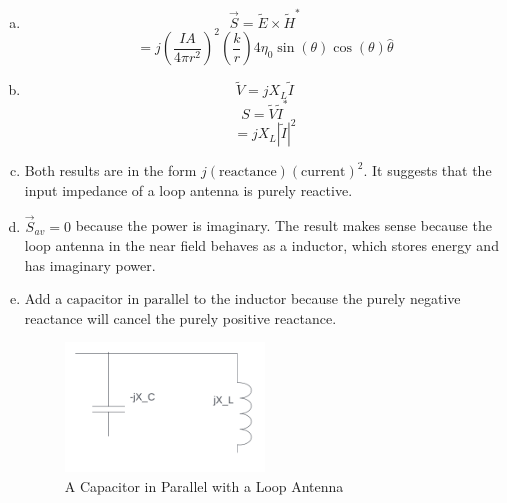 \documentclass{article} %
\begin{document}
\begin{enumerate}[(a)]
      \item
            \[\vec{S} = \widetilde{E} \times \widetilde{H}^*\]
            \[= \boxed{j\left(\frac{IA}{4\pi r^2}\right)^2 \left(\frac{k }{r}\right) 4\eta_0 \sin(\theta)\cos(\theta) \hat{\theta}}\]
      \item
            \[\widetilde{V} = j X_L \widetilde{I}\]
            \[S = \widetilde{V}\widetilde{I}^*\]
            \[= \boxed{j X_L |\widetilde{I}|^2}\]
      \item Both results are in the form $j (\text{reactance}) (\text{current})^2$. It suggests that the input impedance of a loop antenna is purely reactive.
      \item $\boxed{\vec{S}_{av} = 0}$ because the power is imaginary. The result makes sense because the loop antenna in the near field behaves as a inductor, which stores energy and has imaginary power.
      \item Add a $\boxed{\text{capacitor in parallel}}$ to the inductor because the purely negative reactance will cancel the purely positive reactance.
            \begin{figure}[H]
                  \centering
                  \includegraphics[width=0.5\textwidth]{./image/figure1.png}
                  \caption{A Capacitor in Parallel with a Loop Antenna}
            \end{figure}
\end{enumerate}
\end{document}
